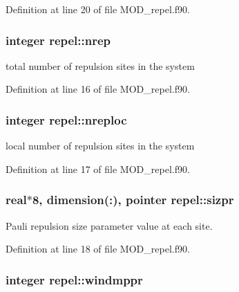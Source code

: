 Definition at line 20 of file M\-O\-D\-\_\-repel.\-f90.

\hypertarget{classrepel_aa057e660d3345ed00ae95e94c2c15862}{
\subsubsection[{nrep}]{\setlength{\rightskip}{0pt plus 5cm}integer repel\-::nrep}}\label{classrepel_aa057e660d3345ed00ae95e94c2c15862}


total number of repulsion sites in the system 



Definition at line 16 of file M\-O\-D\-\_\-repel.\-f90.

\hypertarget{classrepel_aa09824fa35952602fb305944557af5bc}{
\subsubsection[{nreploc}]{\setlength{\rightskip}{0pt plus 5cm}integer repel\-::nreploc}}\label{classrepel_aa09824fa35952602fb305944557af5bc}


local number of repulsion sites in the system 



Definition at line 17 of file M\-O\-D\-\_\-repel.\-f90.

\hypertarget{classrepel_aa01d3fe70eb371350165dafe0e560eca}{
\subsubsection[{sizpr}]{\setlength{\rightskip}{0pt plus 5cm}real$\ast$8, dimension(\-:), pointer repel\-::sizpr}}\label{classrepel_aa01d3fe70eb371350165dafe0e560eca}


Pauli repulsion size parameter value at each site. 



Definition at line 18 of file M\-O\-D\-\_\-repel.\-f90.

\hypertarget{classrepel_a33de080471c0d2957bc43332a32b055f}{
\subsubsection[{windmppr}]{\setlength{\rightskip}{0pt plus 5cm}integer repel\-::windmppr}}\label{classrepel_a33de080471c0d2957bc43332a32b055f}


